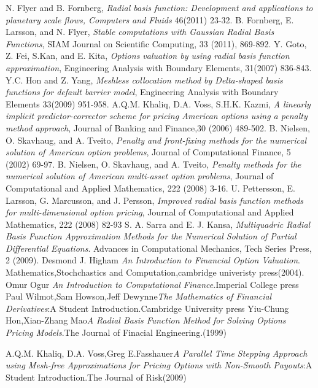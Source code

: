 \documentclass[12pt]{article}
\numberwithin{equation}{section} %
\begin{document}
\begin{thebiblio}{99}
N. Flyer and B. Fornberg,\emph{ Radial basis function: Development
and applications to planetary scale flows, Computers and Fluids}
46(2011) 23-32.
B. Fornberg, E. Larsson, and N. Flyer,\emph{ Stable computations
with Gaussian Radial Basis Functions}, SIAM Journal on Scientific
Computing, 33 (2011), 869-892.
Y. Goto, Z. Fei, S.Kan, and E. Kita, \emph{Options valuation by
using radial basis function approximation}, Engineering Analysis
with Boundary Elements, 31(2007) 836-843.
Y.C. Hon and Z. Yang, \emph{Meshless collocation method by
Delta-shaped basis functions for default barrier model}, Engineering
Analysis with Boundary Elements 33(2009) 951-958.
A.Q.M. Khaliq, D.A. Voss, S.H.K. Kazmi,   \emph{A linearly implicit
predictor-corrector scheme for pricing American options using a
penalty method approach}, Journal of Banking and Finance,30 (2006)
489-502.
B. Nielsen, O. Skavhaug, and A. Tveito, \emph{Penalty and
front-fixing methods for the numerical solution of American option
problems}, Journal of Computational Finance, 5 (2002) 69-97.
B. Nielsen, O. Skavhaug, and A. Tveito,\emph{ Penalty methods for
the numerical solution of American multi-asset option problems},
Journal of Computational and Applied Mathematics, 222 (2008) 3-16.
U.  Pettersson, E. Larsson, G.  Marcusson, and J. Persson,
\emph{Improved radial basis function methods for multi-dimensional
option pricing}, Journal of Computational and Applied Mathematics,
222 (2008) 82-93
S. A. Sarra and E. J. Kansa,  \emph{Multiquadric Radial Basis
Function Approximation Methods for the Numerical Solution of Partial
Differential Equations}. Advances in Computational Mechanics, Tech
Series Press, 2 (2009).
Desmond J. Higham  \emph{An Introduction to Financial Option
Valuation}. Mathematics,Stochchastics and Computation,cambridge
univeristy press(2004).
Omur Ogur \emph{An Introduction to Computational Finance}.Imperial
College press
Paul Wilmot,Sam Howson,Jeff Dewynne\emph{The Mathematics of
Financial Derivatives}:A Student Introduction.Cambridge University
press
Yiu-Chung Hon,Xian-Zhang Mao\emph{A Radial Basis Function Method for
    Solving Options Pricing Models}.The Journal of Finacial
    Engineering.(1999)

A.Q.M. Khaliq, D.A. Voss,Greg E.Fasshauer\emph{A Parallel Time
Stepping Approach using Mesh-free Approximations for Pricing Options
with Non-Smooth Payouts}:A Student Introduction.The Journal of
Risk(2009)
\end{thebiblio}
\Appendixpage
\end{document}
